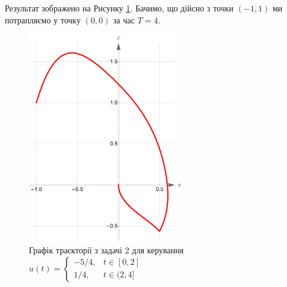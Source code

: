 \documentclass[oneside,solution]{karazin-control-assign}
\begin{document}
Результат зображено на Рисунку \ref{fig:problem_2}. Бачимо, що дійсно з точки $(-1,1)$ ми потрапляємо у точку $(0,0)$ за час $T=4$.

\begin{figure}
    \centering
    \includegraphics[width=0.6\textwidth]{test_3_problem_2.pdf}
    \caption{Графік траєкторії з задачі 2 для керування $u(t) = \begin{cases}
        -5/4, & t \in [0,2] \\ 1/4, & t \in (2,4]
    \end{cases}$}
    \label{fig:problem_2}
\end{figure}
\end{document}
